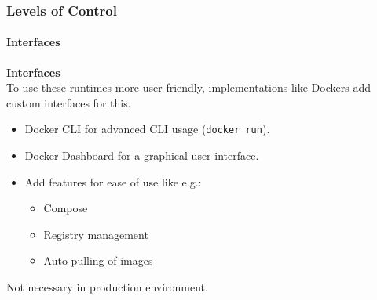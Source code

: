 \begin{frame}
    \frametitle{Levels of Control}
    \framesubtitle{Interfaces}
    \textbf{Interfaces}\\
    To use these runtimes more user friendly, implementations like Dockers add custom interfaces for this.
    \vspace{0.5cm}
    \begin{itemize}
        \item Docker CLI for advanced CLI usage (\texttt{docker run}).
        \item Docker Dashboard for a graphical user interface.
        \item Add features for ease of use like e.g.:
        \begin{itemize}
            \item Compose
            \item Registry management
            \item Auto pulling of images
        \end{itemize}
    \end{itemize}
    \vspace{0.5cm}
    Not necessary in production environment.
\end{frame}